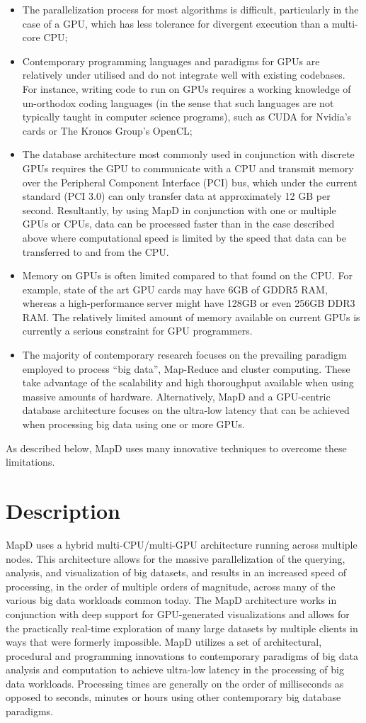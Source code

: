 \documentclass[twocolumn]{article}
\newcommand{\bi}{\begin{itemize}}
\newcommand{\ei}{\end{itemize}}
\newcommand{\ii}{\item}
\begin{document}
\bi
\ii The parallelization process for most algorithms is difficult, particularly in the case of a GPU, which has less tolerance for divergent execution than a multi-core CPU;
\ii Contemporary programming languages and paradigms for GPUs are relatively under utilised and do not integrate well with existing codebases. For instance, writing code to run on GPUs requires a working knowledge of un-orthodox coding languages (in the sense that such languages are not typically taught in computer science programs), such as CUDA for Nvidia’s cards or The Kronos Group’s OpenCL;
\ii The database architecture most commonly used in conjunction with discrete GPUs requires the GPU to communicate with a CPU and transmit memory over the Peripheral Component Interface (PCI) bus, which under the current standard (PCI 3.0) can only transfer data at approximately 12 GB per second. Resultantly, by using MapD in conjunction with one or multiple GPUs or CPUs, data can be processed faster than in the case described above where computational speed is limited by the speed that data can be transferred to and from the CPU.
\ii Memory on GPUs is often limited compared to that found on the CPU. For example, state of the art GPU cards may have 6GB of GDDR5 RAM, whereas a high-performance server might have 128GB or even 256GB DDR3 RAM. The relatively limited amount of memory available on current GPUs is currently a serious constraint for GPU programmers.
\ii The majority of contemporary research focuses on the prevailing paradigm employed to process “big data”, Map-Reduce and cluster computing. These take advantage of the scalability and high thoroughput available when using massive amounts of hardware. Alternatively, MapD and a GPU-centric database architecture focuses on the ultra-low latency that can be achieved when processing big data using one or more GPUs.
\ei

As described below, MapD uses many innovative techniques to overcome these limitations.

\section{Description}

MapD uses a hybrid multi-CPU/multi-GPU architecture running across multiple nodes. This architecture allows for the massive parallelization of the querying, analysis, and visualization of big datasets, and results in an increased speed of processing, in the order of multiple orders of magnitude, across many of the various big data workloads common today. The MapD architecture works in conjunction with deep support for GPU-generated visualizations and allows for the practically real-time exploration of many large datasets by
multiple clients in ways that were formerly impossible. MapD utilizes a set of architectural, procedural and programming innovations to contemporary paradigms of big data analysis and computation to achieve ultra-low latency in the processing of big data workloads. Processing times are generally on the order of milliseconds as opposed to seconds, minutes or hours using other contemporary big database paradigms.
\end{document}
